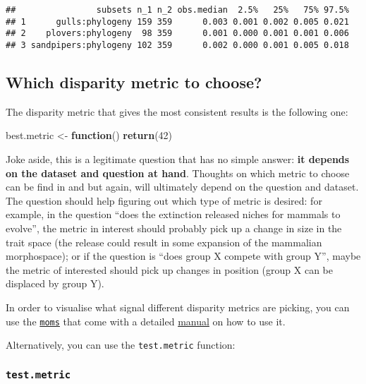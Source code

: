 \documentclass[
]{book}
\newenvironment{Shaded}{\begin{snugshade}}{\end{snugshade}}
\newcommand{\ControlFlowTok}[1]{\textcolor[rgb]{0.13,0.29,0.53}{\textbf{#1}}}
\newcommand{\DecValTok}[1]{\textcolor[rgb]{0.00,0.00,0.81}{#1}}
\newcommand{\FunctionTok}[1]{\textcolor[rgb]{0.13,0.29,0.53}{\textbf{#1}}}
\newcommand{\NormalTok}[1]{#1}
\newcommand{\OtherTok}[1]{\textcolor[rgb]{0.56,0.35,0.01}{#1}}
\begin{document}
\begin{verbatim}
##                subsets n_1 n_2 obs.median  2.5%   25%   75% 97.5%
## 1      gulls:phylogeny 159 359      0.003 0.001 0.002 0.005 0.021
## 2    plovers:phylogeny  98 359      0.001 0.000 0.001 0.001 0.006
## 3 sandpipers:phylogeny 102 359      0.002 0.000 0.001 0.005 0.018
\end{verbatim}

\hypertarget{which-disparity-metric-to-choose}{%
\subsection{Which disparity metric to choose?}\label{which-disparity-metric-to-choose}}

The disparity metric that gives the most consistent results is the following one:

\begin{Shaded}
\begin{Highlighting}[]
\NormalTok{best.metric }\OtherTok{\textless{}{-}} \ControlFlowTok{function}\NormalTok{() }\FunctionTok{return}\NormalTok{(}\DecValTok{42}\NormalTok{)}
\end{Highlighting}
\end{Shaded}

Joke aside, this is a legitimate question that has no simple answer: \textbf{it depends on the dataset and question at hand}.
Thoughts on which metric to choose can be find in \citet{moms} and \citet{Guillerme2020} but again, will ultimately depend on the question and dataset.
The question should help figuring out which type of metric is desired: for example, in the question ``does the extinction released niches for mammals to evolve'', the metric in interest should probably pick up a change in size in the trait space (the release could result in some expansion of the mammalian morphospace); or if the question is ``does group X compete with group Y'', maybe the metric of interested should pick up changes in position (group X can be displaced by group Y).

In order to visualise what signal different disparity metrics are picking, you can use the \href{https://tguillerme.shinyapps.io/moms/}{\texttt{moms}} that come with a detailed \href{https://rawcdn.githack.com/TGuillerme/moms/master/inst/moms_vignette.html}{manual} on how to use it.

Alternatively, you can use the \texttt{test.metric} function:

\hypertarget{test-metric}{%
\subsubsection{\texorpdfstring{\texttt{test.metric}}{test.metric}}\label{test-metric}}
\end{document}
